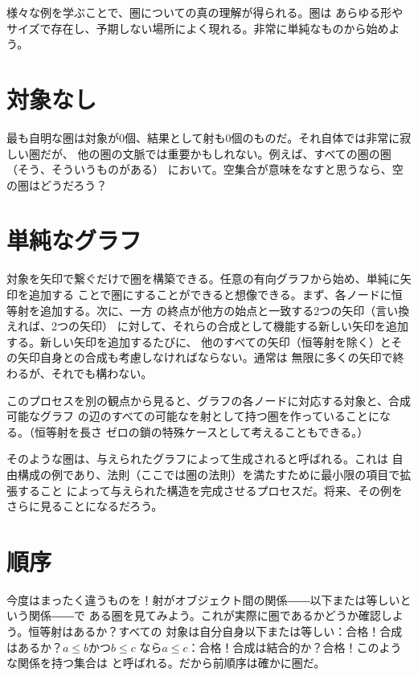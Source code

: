 
\lettrine[lhang=0.17]{様}{々な例を学ぶことで、}圏についての真の理解が得られる。圏は
あらゆる形やサイズで存在し、予期しない場所によく現れる。非常に単純なものから始めよう。

\section{対象なし}

最も自明な圏は対象が0個、結果として射も0個のものだ。それ自体では非常に寂しい圏だが、
他の圏の文脈では重要かもしれない。例えば、すべての圏の圏（そう、そういうものがある）
において。空集合が意味をなすと思うなら、空の圏はどうだろう？

\section{単純なグラフ}

対象を矢印で繋ぐだけで圏を構築できる。任意の有向グラフから始め、単純に矢印を追加する
ことで圏にすることができると想像できる。まず、各ノードに恒等射を追加する。次に、一方
の終点が他方の始点と一致する2つの矢印（言い換えれば、2つの矢印）
に対して、それらの合成として機能する新しい矢印を追加する。新しい矢印を追加するたびに、
他のすべての矢印（恒等射を除く）とその矢印自身との合成も考慮しなければならない。通常は
無限に多くの矢印で終わるが、それでも構わない。

このプロセスを別の観点から見ると、グラフの各ノードに対応する対象と、合成可能なグラフ
の辺のすべての可能なを射として持つ圏を作っていることになる。（恒等射を長さ
ゼロの鎖の特殊ケースとして考えることもできる。）

そのような圏は、与えられたグラフによって生成されると呼ばれる。これは
自由構成の例であり、法則（ここでは圏の法則）を満たすために最小限の項目で拡張すること
によって与えられた構造を完成させるプロセスだ。将来、その例をさらに見ることになるだろう。

\section{順序}

今度はまったく違うものを！射がオブジェクト間の関係――以下または等しいという関係――で
ある圏を見てみよう。これが実際に圏であるかどうか確認しよう。恒等射はあるか？すべての
対象は自分自身以下または等しい：合格！合成はあるか？$a \leqslant b$かつ$b \leqslant c$
なら$a \leqslant c$：合格！合成は結合的か？合格！このような関係を持つ集合は
と呼ばれる。だから前順序は確かに圏だ。


